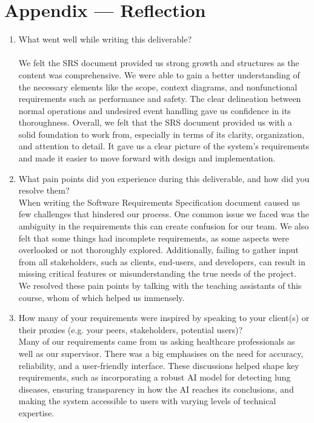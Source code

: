 \documentclass[12pt]{article}
\begin{document}
\section*{Appendix --- Reflection}
\begin{enumerate}
  \item What went well while writing this deliverable? \\\\
We felt the SRS document provided us strong growth and structures as the content was comprehensive. We were able to gain a better understanding of the necessary elements like the scope, context diagrams, and nonfunctional requirements such as performance and safety. The clear delineation between normal operations and undesired event handling gave us confidence in its thoroughness. Overall, we felt that the SRS document provided us with a solid foundation to work from, especially in terms of its clarity, organization, and attention to detail. It gave us a clear picture of the system's requirements and made it easier to move forward with design and implementation.


  \item What pain points did you experience during this deliverable, and how did
  you resolve them? \\

When writing the Software Requirements Specification document caused us few challenges that hindered our process. One common issue we faced was the ambiguity in the requirements this can create confusion for our team. We also felt that some things had incomplete requirements, as some aspects were overlooked or not thoroughly explored. Additionally, failing to gather input from all stakeholders, such as clients, end-users, and developers, can result in missing critical features or misunderstanding the true needs of the project. We resolved these pain points by talking with the teaching assistants of this course, whom of which helped us immensely.  


  \item How many of your requirements were inspired by speaking to your
  client(s) or their proxies (e.g. your peers, stakeholders, potential users)? \\
  
Many of our requirements came from us asking healthcare professionals as well as our supervisor. There was a big emphasises on the need for accuracy, reliability, and a user-friendly interface. These discussions helped shape key requirements, such as incorporating a robust AI model for detecting lung diseases, ensuring transparency in how the AI reaches its conclusions, and making the system accessible to users with varying levels of technical expertise.
      

\end{enumerate}
\end{document}
